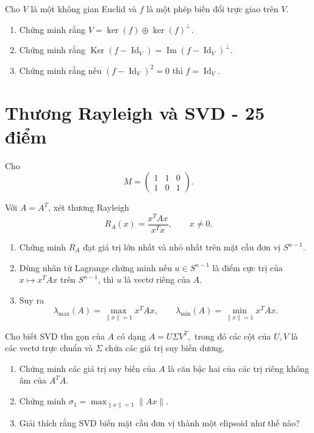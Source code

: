 ﻿\documentclass[12pt,a4paper]{article}
\DeclareMathOperator{\Ker}{Ker}
\DeclareMathOperator{\Imv}{Im}
\DeclareMathOperator{\Id}{Id}
\begin{document}
\begin{problem}[6 điểm]

Cho $V$ là một không gian Euclid và $f$ là một phép biến đổi trực giao trên $V$.
\begin{enumerate}[label=(\alph*)]
    \item Chứng minh rằng $V = \ker(f) \oplus \ker(f)^\bot$.
    \item Chứng minh rằng $\Ker(f-\Id_V)=\Imv(f-\Id_V)^\perp$.
    \item Chứng minh rằng nếu $(f-\Id_V)^2=0$ thì $f=\Id_V$.
\end{enumerate}

\end{problem}

\section{Thương Rayleigh và SVD - 25 điểm}

Cho
\[
M=
\begin{pmatrix}
1&1&0\\
1&0&1
\end{pmatrix}.
\]

\begin{problem}[7 điểm]


Với $A=A^T$, xét thương Rayleigh
\[
R_A(x)=\frac{x^TAx}{x^Tx},\qquad x\ne0.
\]

\begin{enumerate}[label=(\alph*)]
    \item Chứng minh $R_A$ đạt giá trị lớn nhất và nhỏ nhất trên mặt cầu đơn vị $S^{n-1}$.
    \item Dùng nhân tử Lagrange chứng minh nếu $u\in S^{n-1}$ là điểm cực trị của $x\mapsto x^TAx$ trên $S^{n-1}$, thì $u$ là vectơ riêng của $A$.
    \item Suy ra
    \[
    \lambda_{\max}(A)=\max_{\|x\|=1}x^TAx,
    \qquad
    \lambda_{\min}(A)=\min_{\|x\|=1}x^TAx.
    \]
\end{enumerate}

\end{problem}

\begin{problem}[6 điểm]


Cho biết SVD thu gọn của $A$ có dạng
$
A=U\Sigma V^T,
$
trong đó các cột của $U,V$ là các vectơ trực chuẩn và $\Sigma$ chứa các giá trị suy biến dương.

\begin{enumerate}[label=(\alph*)]
    \item Chứng minh các giá trị suy biến của $A$ là căn bậc hai của các trị riêng không âm của $A^TA$.
    \item Chứng minh
    $
    \sigma_1=\max_{\|x\|=1}\|Ax\|.
    $
    \item Giải thích rằng SVD biến mặt cầu đơn vị thành một elipsoid như thế nào?
\end{enumerate}

\end{problem}
\end{document}
